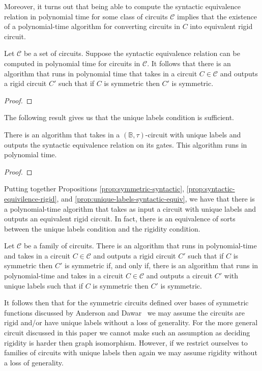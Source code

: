 \documentclass[../paper.tex]{subfiles}
\begin{document}
Moreover, it turns out that being able to compute the syntactic equivalence
relation in polynomial time for some class of circuits $\mathcal{C}$ implies
that the existence of a polynomial-time algorithm for converting circuits in $C$
into equivalent rigid circuit.

\begin{prop}
  Let $\mathcal{C}$ be a set of circuits. Suppose the syntactic equivalence
  relation can be computed in polynomial time for circuits in $\mathcal{C}$. It
  follows that there is an algorithm that runs in polynomial time that takes in
  a circuit $C \in \mathcal{C}$ and outputs a rigid circuit $C'$ such that if
  $C$ is symmetric then $C'$ is symmetric.
  \label{prop:syntactic-equivilence-rigid}
\end{prop}
\begin{proof}
\end{proof}

The following result gives us that the unique labels condition is sufficient.

\begin{prop}
  There is an algorithm that takes in a $(\mathbb{B}, \tau)$-circuit with unique
  labels and outputs the syntactic equivalence relation on its gates. This
  algorithm runs in polynomial time.
  \label{prop:unique-labels-syntactic-equiv}
\end{prop}
\begin{proof}
\end{proof}

Putting together Propositions \ref{prop:symmetric-syntactic},
\ref{prop:syntactic-equivilence-rigid}, and
\ref{prop:unique-labels-syntactic-equiv}, we have that there is a
polynomial-time algorithm that takes as input a circuit with unique labels and
outputs an equivalent rigid circuit. In fact, there is an equivalence of sorts
between the unique labels condition and the rigidity condition.

\begin{prop}
  Let $\mathcal{C}$ be a family of circuits. There is an algorithm that runs in
  polynomial-time and takes in a circuit $C \in \mathcal{C}$ and outputs a rigid
  circuit $C'$ such that if $C$ is symmetric then $C'$ is symmetric if, and only
  if, there is an algorithm that runs in polynomial-time and takes in a circuit
  $C \in \mathcal{C}$ and outputs a circuit $C'$ with unique labels such that if
  $C$ is symmetric then $C'$ is symmetric.
\end{prop}

It follows then that for the symmetric circuits defined over bases of symmetric
functions discussed by Anderson and Dawar~\cite{} we may assume the circuits are
rigid and/or have unique labels without a loss of generality. For the more
general circuit discussed in this paper we cannot make such an assumption as
deciding rigidity is harder then graph isomorphism. However, if we restrict
ourselves to families of circuits with unique labels then again we may assume
rigidity without a loss of generality.
\end{document}
